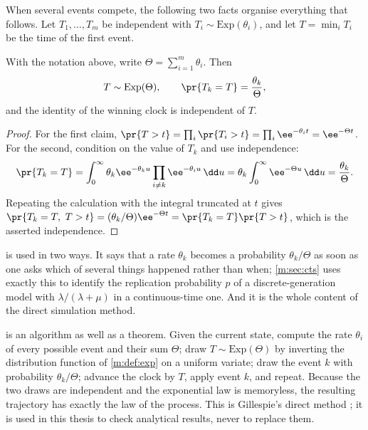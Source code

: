 When several events compete, the following two facts organise everything that
follows. Let $T_1,\dots,T_m$ be independent with $T_i\sim\mathrm{Exp}(\theta_i)$,
and let $T = \min_i T_i$ be the time of the first event.

\begin{proposition}
\label{m:prop:race}
With the notation above, write $\Theta = \sum_{i=1}^m\theta_i$. Then
\begin{equation}
\label{m:eq:race}
T \sim \mathrm{Exp}(\Theta),
\qquad
\pr{T_k = T} = \frac{\theta_k}{\Theta},
\end{equation}
and the identity of the winning clock is independent of $T$.
\end{proposition}

\begin{proof}
For the first claim,
$\pr{T>t} = \prod_i\pr{T_i>t} = \prod_i\ee^{-\theta_i t} = \ee^{-\Theta t}$.
For the second, condition on the value of $T_k$ and use independence:
\begin{equation*}
\pr{T_k = T}
= \int_0^\infty \theta_k\ee^{-\theta_k u}\prod_{i\neq k}\ee^{-\theta_i u}\,\dd u
= \theta_k\int_0^\infty \ee^{-\Theta u}\,\dd u
= \frac{\theta_k}{\Theta}.
\end{equation*}
Repeating the calculation with the integral truncated at $t$ gives
$\pr{T_k=T,\ T>t} = (\theta_k/\Theta)\ee^{-\Theta t}
= \pr{T_k=T}\pr{T>t}$, which is the asserted independence.
\end{proof}

 is used in two ways. It says that a rate $\theta_k$ becomes a
probability $\theta_k/\Theta$ as soon as one asks which of several things happened
rather than when; \cref{m:sec:cts} uses exactly this to identify the replication
probability $p$ of a discrete-generation model with $\lambda/(\lambda+\mu)$ in a
continuous-time one. And it is the whole content of the direct simulation method.

\begin{remark}
\label{m:rem:gillespie}
 is an algorithm as well as a theorem. Given the current state,
compute the rate $\theta_i$ of every possible event and their sum $\Theta$; draw
$T\sim\mathrm{Exp}(\Theta)$ by inverting the distribution function of
\cref{m:def:exp} on a uniform variate; draw the event $k$ with probability
$\theta_k/\Theta$; advance the clock by $T$, apply event $k$, and repeat. Because
the two draws are independent and the exponential law is memoryless, the resulting
trajectory has exactly the law of the process. This is Gillespie's direct method
\cite{Gillespie1977}; it is used in this thesis to check analytical results, never
to replace them.
\end{remark}


